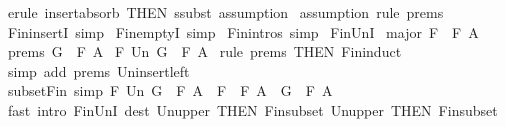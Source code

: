 \begin{isabellebody}
\isamarkupfalse%
\ {\isacharparenleft}erule\ insert{\isacharunderscore}absorb\ {\isacharbrackleft}THEN\ ssubst{\isacharbrackright}{\isacharcomma}\ assumption{\isacharparenright}\isanewline
{}\isamarkupfalse%
\ {\isacharparenleft}assumption{\isacharcomma}\ rule\ prems{\isacharparenright}{\isacharplus}\isanewline
{}\isamarkupfalse%
%
\endisatagproof
{\isafoldproof}%
%
\isadelimproof
\isanewline
%
\endisadelimproof
\isanewline
\isanewline
{}\isamarkupfalse%
\ Fin{\isachardot}insertI\ {\isacharbrackleft}simp{\isacharbrackright}\isanewline
{}\isamarkupfalse%
\ Fin{\isachardot}emptyI\ {\isacharbrackleft}simp{\isacharbrackright}\isanewline
\isanewline
{}\isamarkupfalse%
\ Fin{\isachardot}intros\ {\isacharbrackleft}simp{\isacharbrackright}\isanewline
\isanewline
\isanewline
{}\isamarkupfalse%
\ Fin{\isacharunderscore}UnI{\isacharcolon}\isanewline
{}\ major{\isacharcolon}\ {\isachardoublequoteopen}F\ {\isacharcolon}\ {\isacharpercent}F\ A{\isachardoublequoteclose}\isanewline
{}\ prems{\isacharcolon}\ {\isachardoublequoteopen}G\ {\isacharcolon}\ {\isacharpercent}F\ A{\isachardoublequoteclose}\isanewline
{}\ {\isachardoublequoteopen}F\ Un\ G\ {\isacharcolon}\ {\isacharpercent}F\ A{\isachardoublequoteclose}\isanewline
%
\isadelimproof
%
\endisadelimproof
%
\isatagproof
{}\isamarkupfalse%
\ {\isacharparenleft}rule\ prems\ {\isacharbrackleft}THEN\ Fin{\isacharunderscore}induct{\isacharbrackright}{\isacharparenright}\isanewline
{}\isamarkupfalse%
\ {\isacharparenleft}simp\ add{\isacharcolon}\ prems\ Un{\isacharunderscore}insert{\isacharunderscore}left{\isacharparenright}{\isacharplus}\isanewline
{}\isamarkupfalse%
%
\endisatagproof
{\isafoldproof}%
%
\isadelimproof
\isanewline
%
\endisadelimproof
\isanewline
\isanewline
\isanewline
\isanewline
{}\isamarkupfalse%
\ subset{\isacharunderscore}Fin\ {\isacharbrackleft}simp{\isacharbrackright}{\isacharcolon}\ {\isachardoublequoteopen}{\isacharparenleft}F\ Un\ G\ {\isacharcolon}\ {\isacharpercent}F\ A{\isacharparenright}\ {\isacharequal}\ {\isacharparenleft}F\ {\isacharcolon}\ {\isacharpercent}F\ A\ {\isacharampersand}\ G\ {\isacharcolon}\ {\isacharpercent}F\ A{\isacharparenright}{\isachardoublequoteclose}\isanewline
%
\isadelimproof
%
\endisadelimproof
%
\isatagproof
{}\isamarkupfalse%
\ {\isacharparenleft}fast\ intro{\isacharcolon}\ Fin{\isacharunderscore}UnI\ dest{\isacharcolon}\ Un{\isacharunderscore}upper{}\ {\isacharbrackleft}THEN\ Fin{\isacharunderscore}subset{\isacharbrackright}\ Un{\isacharunderscore}upper{}\ {\isacharbrackleft}THEN\ Fin{\isacharunderscore}subset{\isacharbrackright}{\isacharparenright}\isanewline

\end{isabellebody}
